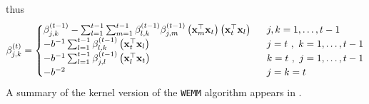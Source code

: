  thus
\[
\beta_{j,k}^{\left(t\right)}=\begin{cases}
\beta_{j,k}^{\left(t-1\right)}-\sum_{l=1}^{t-1}\sum_{m=1}^{t-1}\beta_{l,k}^{\left(t-1\right)}\beta_{j,m}^{\left(t-1\right)}\left(\mathbf{x}_{m}^{\top}\mathbf{x}_{t}\right)\left(\mathbf{x}_{t}^{\top}\mathbf{x}_{l}\right) & ~~ j,k=1 , \ldots , t-1\\
-b^{-1}\sum_{l=1}^{t-1}\beta_{l,k}^{\left(t-1\right)}\left(\mathbf{x}_{t}^{\top}\mathbf{x}_{l}\right) & ~~ j=t~,~k=1 , \ldots , t-1\\
-b^{-1}\sum_{l=1}^{t-1}\beta_{j,l}^{\left(t-1\right)}\left(\mathbf{x}_{l}^{\top}\mathbf{x}_{t}\right) & ~~  k=t~,~j=1 , \ldots , t-1\\
-b^{-2} & ~~ j=k=t
\end{cases}
\]
 A summary of the kernel version of the \texttt{WEMM} algorithm appears in .

